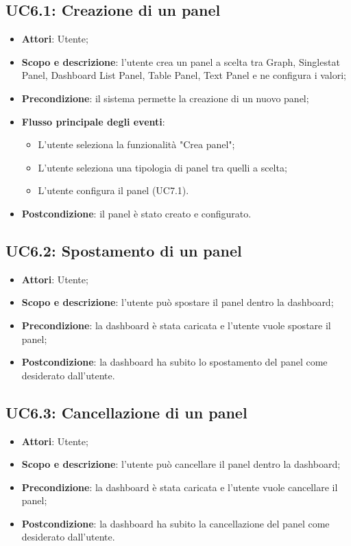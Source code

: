 \subsection{UC6.1: Creazione di un panel}
\hypertarget{UC6.1}{}
\begin{itemize}
	\item \textbf{Attori}: Utente;
	\item \textbf{Scopo e descrizione}: l'utente crea un panel a scelta tra Graph, Singlestat Panel, Dashboard List Panel, Table Panel, Text Panel e ne configura i valori;
	\item \textbf{Precondizione}: il sistema permette la creazione di un nuovo panel;
	\item \textbf{Flusso principale degli eventi}:
	\begin{itemize}
		\item L'utente seleziona la funzionalità "Crea panel";
		\item L'utente seleziona una tipologia di panel tra quelli a scelta;
		\item L'utente configura il panel (UC7.1).
	\end{itemize}
	\item \textbf{Postcondizione}: il panel è stato creato e configurato.
\end{itemize}
\subsection{UC6.2: Spostamento di un panel}
\hypertarget{UC6.2}{}
\begin{itemize}
	\item \textbf{Attori}: Utente;
	\item \textbf{Scopo e descrizione}: l'utente può spostare il panel dentro la dashboard;
	\item \textbf{Precondizione}: la dashboard è stata caricata e l'utente vuole spostare il panel;
	\item \textbf{Postcondizione}: la dashboard ha subito lo spostamento del panel come desiderato dall'utente.
\end{itemize}
\subsection{UC6.3: Cancellazione di un panel}
\hypertarget{UC6.3}{}
\begin{itemize}
	\item \textbf{Attori}: Utente;
	\item \textbf{Scopo e descrizione}: l'utente può cancellare il panel dentro la dashboard;
	\item \textbf{Precondizione}: la dashboard è stata caricata e l'utente vuole cancellare il panel;
	\item \textbf{Postcondizione}: la dashboard ha subito la cancellazione del panel come desiderato dall'utente.
\end{itemize}
